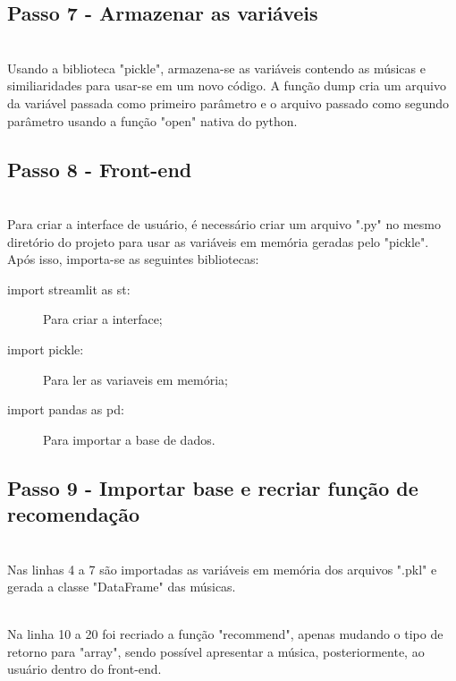 \documentclass[a4paper, 12pt]{article}
\begin{document}
\subsection{Passo 7 - Armazenar as variáveis}

\\Usando a biblioteca "pickle", armazena-se as variáveis contendo as músicas e similiaridades para usar-se em um novo código. A função dump cria um arquivo da variável passada como primeiro parâmetro e o arquivo passado como segundo parâmetro usando a função "open" nativa do python.

\subsection{Passo 8 - Front-end}

\\Para criar a interface de usuário, é necessário criar um arquivo ".py" no mesmo diretório do projeto para usar as variáveis em
memória geradas pelo "pickle". Após isso, importa-se as seguintes bibliotecas:

\begin{itemize}
  \begin{description}
    \item[import streamlit as st:] Para criar a interface;
    \item[import pickle:] Para ler as variaveis em memória;
    \item[import pandas as pd:] Para importar a base de dados.
  \end{description}
\end{itemize}

\subsection{Passo 9 - Importar base e recriar função de recomendação}

\\Nas linhas 4 a 7 são importadas as variáveis em memória dos arquivos ".pkl" e gerada a classe "DataFrame" das músicas.

\\Na linha 10 a 20 foi recriado a função "recommend", apenas mudando o tipo de retorno para "array", sendo possível apresentar
a música, posteriormente, ao usuário dentro do front-end.
\end{document}
